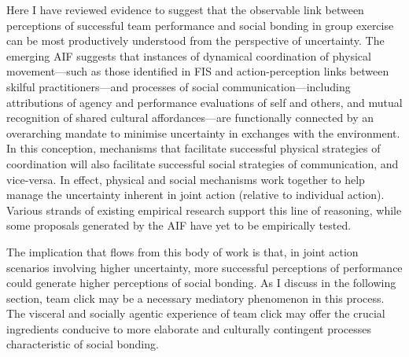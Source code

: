\begin{CJK}{UTF8}{gbsn}
Here I have reviewed evidence to suggest that the observable link between perceptions of successful team performance and social bonding in group exercise can be most productively understood from the perspective of uncertainty.  The emerging AIF suggests that instances of dynamical coordination of physical movement---such as those identified in FIS and action-perception links between skilful practitioners---and processes of social communication---including attributions of agency and performance evaluations of self and others, and mutual recognition of shared cultural affordances---are functionally connected by an overarching mandate to minimise uncertainty in exchanges with the environment.  In this conception, mechanisms that facilitate successful physical strategies of coordination will also facilitate successful social strategies of communication, and vice-versa.  In effect, physical and social mechanisms work together to help manage the uncertainty inherent in joint action (relative to individual action).  Various strands of existing empirical research support this line of reasoning, while some proposals generated by the AIF have yet to be empirically tested.

The implication that flows from this body of work is that, in joint action scenarios involving higher uncertainty, more successful perceptions of performance could generate higher perceptions of social bonding.  As I discuss in the following section, team click may be a necessary mediatory phenomenon in this process.  The visceral and socially agentic experience of team click may offer the crucial ingredients conducive to more elaborate and culturally contingent processes characteristic of social bonding.









\end{CJK}
